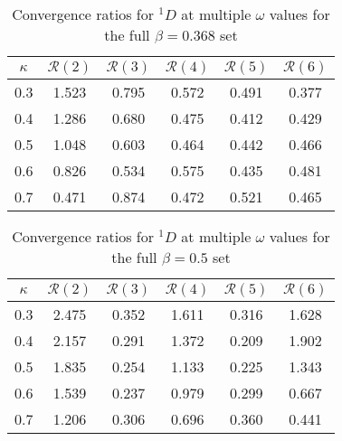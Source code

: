 \documentclass[Dissertation.tex]{subfiles}
\begin{document}
\begin{table}[H]
\centering
\begin{tabular}{cccccc}
\toprule
$\kappa$ & $\mathcal{R}(2)$ & $\mathcal{R}(3)$ & $\mathcal{R}(4)$ & $\mathcal{R}(5)$ & $\mathcal{R}(6)$ \\
\midrule
0.3 & 1.523 & 0.795 & 0.572 & 0.491 & 0.377 \\
0.4 & 1.286 & 0.680 & 0.475 & 0.412 & 0.429 \\
0.5 & 1.048 & 0.603 & 0.464 & 0.442 & 0.466 \\
0.6 & 0.826 & 0.534 & 0.575 & 0.435 & 0.481 \\
0.7 & 0.471 & 0.874 & 0.472 & 0.521 & 0.465 \\
\bottomrule
\end{tabular}
\caption{Convergence ratios for $^1D$ at multiple $\omega$ values for the full $\beta = 0.368$ set}
\label{tab:D1Beta368VarConv}
\end{table}


\begin{table}[H]
\centering
\begin{tabular}{cccccc}
\toprule
$\kappa$ & $\mathcal{R}(2)$ & $\mathcal{R}(3)$ & $\mathcal{R}(4)$ & $\mathcal{R}(5)$ & $\mathcal{R}(6)$ \\
\midrule
0.3 & 2.475 & 0.352 & 1.611 & 0.316 & 1.628 \\
0.4 & 2.157 & 0.291 & 1.372 & 0.209 & 1.902 \\
0.5 & 1.835 & 0.254 & 1.133 & 0.225 & 1.343 \\
0.6 & 1.539 & 0.237 & 0.979 & 0.299 & 0.667 \\
0.7 & 1.206 & 0.306 & 0.696 & 0.360 & 0.441 \\
\bottomrule
\end{tabular}
\caption{Convergence ratios for $^1D$ at multiple $\omega$ values for the full $\beta = 0.5$ set}
\label{tab:D1Beta5VarConv}
\end{table}
\end{document}
